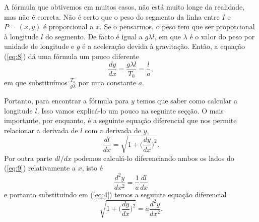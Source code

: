 A fórmula que obtivemos em muitos casos, não está muito longe da
realidade, mas não é correta. Não é certo que o peso do segmento
da linha entre $I$ e $P=(x,y)$ é proporcional a $x$.  Se o pensarmos,
o peso tem que ser proporcional à longitude $l$ do segmento. De
facto é igual a $g \lambda l$, em que $\lambda$ é o valor do peso
por unidade de longitude e $g$ é a aceleração devida à
gravitação. Então, a equação (\ref{eq:8}) dá uma fórmula um
pouco diferente
\begin{equation}
  \label{eq:9}
  \frac{dy}{dx}=\frac{g \lambda l}{T_0}=\frac{l}{a},
\end{equation}
em que substituímos $\frac{T_0}{g \lambda}$ por uma constante $a$.

Portanto, para encontrar a fórmula para $y$ temos que saber
como calcular a longitude $l$. Isso vamos explicá-lo um pouco na
seguinte seçção. O mais importante, por enquanto, é a seguinte
equação diferencial que nos permite relacionar a derivada de $l$
com a derivada de $y$,
\begin{equation}
  \label{eq:4}
  \frac{dl}{dx}=\sqrt{1+\Big(\frac{dy}{dx}\Big)^2}.
\end{equation}
Por outra parte $dl/dx$ podemos calculá-lo diferenciando ambos os lados do
(\ref{eq:9}) relativamente a $x$, isto é
\begin{displaymath}
  \frac{d^2y}{dx^2}=\frac{1}{a}\frac{dl}{dx}
\end{displaymath}
e portanto substituindo em (\ref{eq:4}) temos a seguinte
equação diferencial
\begin{displaymath}
  \sqrt{1+\Big(\frac{dy}{dx}\Big)^2}=a\frac{d^2y}{dx^2}.
\end{displaymath}

